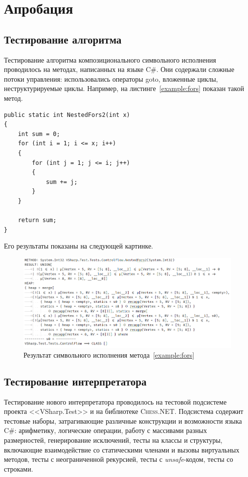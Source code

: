 \section{Апробация}
\subsection{Тестирование алгоритма}
Тестирование алгоритма композиционального символьного исполнения проводилось на методах, написанных на языке C\#.
Они содержали сложные потоки управления: использовались операторы goto, вложенные циклы, неструктурируемые циклы.
Например, на листинге~\ref{example:fors} показан такой метод.
\begin{lstlisting}[language={[Sharp]C}, caption={Программа, содержащая вложенные циклы},captionpos=b,
label={example:fors}]
public static int NestedFors2(int x)
{
    int sum = 0;
    for (int i = 1; i <= x; i++)
    {
        for (int j = 1; j <= i; j++)
        {
            sum += j;
        }
    }

    return sum;
}
\end{lstlisting}

Его результаты показаны на следующей картинке.
\begin{figure}[H]
\centering
\includegraphics[scale=0.6]{Batoev/images/results.PNG}
\caption{Результат символьного исполнения метода~\ref{example:fors}}
\end{figure}

\subsection{Тестирование интерпретатора}
Тестирование нового интерпретатора проводилось на тестовой подсистеме проекта <<VSharp.Test>> и на библиотеке \textsc{Chess.NET}.
Подсистема содержит тестовые наборы, затрагивающие различные конструкции и возможности языка C\#:
арифметику, логические операции,
работу с массивами разных размерностей, генерирование исключений, тесты на классы и структуры, включающие взаимодействие со статическими членами и вызовы виртуальных методов,
тесты с неограниченной рекурсией, тесты с \emph{unsafe}-кодом, тесты со строками. 


